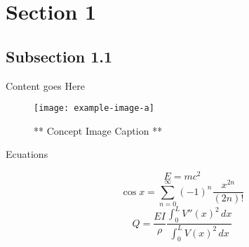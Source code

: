 \graphicspath{{Images/}}

\section{Section 1}
    \subsection{Subsection 1.1}

    Content goes Here


\begin{figure}[h]
    \centering
    \texttt{[image: example-image-a]}
    \caption{** Concept Image Caption **}
    \label{fig:my_label}
\end{figure}


Ecuations

\begin{equation}
    E = mc^2
\end{equation}
\begin{equation}
    \cos{x} = \sum_{n=0}^{\infty} (-1)^n \frac{x^{2n}}{(2n)!}
\end{equation}
\begin{equation}
    Q = \frac{EI}{\rho}\frac{\int_0^L {V''(x)}^2 \,dx}{\int_0^L {V(x)}^2 \,dx}
\end{equation}
